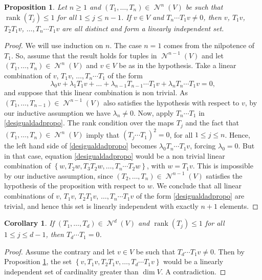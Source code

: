 \documentclass[JEP,XML,SOM,Unicode,NoEqCountersInSection]{cedram}
\let\mathcal\mathscr
\theoremstyle{plain}
\newtheorem{prop}[teo]{Proposition}
\newtheorem{coro}[teo]{Corollary}
\theoremstyle{definition}
\newcommand{\corchete}[1]{\left\{{#1}\right\}}
\DeclareMathOperator{\Nil}{\mathcal{N}}
\DeclareMathOperator{\rank}{rank}
\begin{document}
\begin{prop}\label{proprango}
Let $n\geq 1$ and $(T_1,\dots,T_n)\in \Nil^{n}(V)$ be such that $\rank(T_j)\leq 1$ for all $1\leq j\leq n-1$. If $v\in V$ and $T_n\cdots T_{1}v\neq 0$, then $v$, $T_1{v}$, $T_{2}T_{1}v$, $\dots,T_{n}\cdots T_{1}v$ are all distinct and form a linearly independent set.
\end{prop}
\begin{proof} We will use induction on $n$. The case $n=1$ comes from the nilpotence of $T_1$. So, assume that the result holds for tuples in $\Nil^{n-1}(V)$ and let $(T_1,\dots,T_{n})\in \Nil^{n}(V)$ and $v\in V$ be as in the hypothesis.
Take a linear combination of $v$, $T_1{v}$, $\dots,T_{n}\cdots T_{1}$ of the form\vspace*{-3pt}\enlargethispage{\baselineskip}%
\begin{equation}\label{desigualdadpropo}
\lambda_{0}v+\lambda_{1}T_1{v}+\dots+\lambda_{n-1}T_{n-1}\cdots T_{1}v+\lambda_{n}T_{n}\cdots T_{1}v=0,
\end{equation}
and suppose that this linear combination is non trivial. As $(T_1,\dots,T_{n-1})\in \Nil^{n-1}(V)$ also satisfies the hypothesis with respect to $v$, by our inductive assumption we have $\lambda_{n}\neq 0$.
Now, apply $T_{n}\cdots T_{1}$ in \eqref{desigualdadpropo}. The rank condition over the maps $T_{j}$ and the fact that $(T_1,\dots,T_n)\in \Nil^{n}(V)$ imply that $(T_{j}\cdots T_{1})^{2}=0$, for all $1\leq j \leq n$. Hence, the left hand side of \eqref{desigualdadpropo} becomes $\lambda_{0}T_{n}\cdots T_{1}v$, forcing $\lambda_{0}=0$. But in that case, equation \eqref{desigualdadpropo} would be a non trivial linear combination of $\corchete{w,T_{2}{w},T_{3}T_{2}w,\dots,T_{n}\cdots T_{2}w}$, with $w=T_{1}v$. This is impossible by our inductive assumption, since $(T_{2},\dots,T_{n})\in \Nil^{n-1}(V)$ satisfies the hypothesis of the proposition with respect to $w$. We conclude that all linear combinations of $v$, $T_1{v}$, $T_{2}T_{1}v$, $\dots,T_{n}\cdots T_{1}v$ of the form \eqref{desigualdadpropo} are trivial, and hence this set is linearly independent with exactly $n+1$ elements.
\end{proof}

\begin{coro}\label{cororango}
If $(T_1,\dots,T_d)\in \Nil^{d}(V)$ and $\rank(T_j)\leq 1$ for all $1 \leq j\leq d-1$, then $T_d\cdots T_1=0$.
\end{coro}
\begin{proof}
Assume the contrary and let $v\in V$ be such that $T_{d}\cdots T_{1}v\neq 0$. Then by Proposition \ref{proprango}, the set $\corchete{v,T_1{v},T_{2}T_{1}v,\dots,T_{d}\cdots T_{1}v}$ would be a linearly independent set of cardinality greater than $\dim{V}$. A contradiction.
\end{proof}
\end{document}
